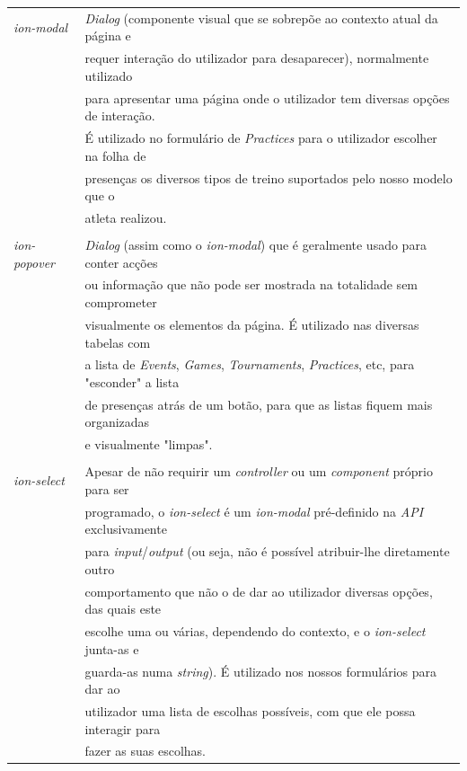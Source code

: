 \begin{tabular}{ll}
	\textit{ion-modal} & \textit{Dialog} (componente visual que se sobrepõe ao contexto atual da página e \\
	&requer interação do utilizador para desaparecer), normalmente utilizado \\
	&para apresentar uma página onde o utilizador tem diversas opções de interação.\\
	& É utilizado no formulário de \textit{Practices} para o utilizador escolher na folha de \\
	&presenças os diversos tipos de treino suportados pelo nosso modelo que o \\
	&atleta realizou.\\
	\\
	\textit{ion-popover} & \textit{Dialog} (assim como o \textit{ion-modal}) que é geralmente usado para conter acções \\
	&ou informação que não pode ser mostrada na totalidade sem comprometer\\
	& visualmente os elementos da página. É utilizado nas diversas tabelas com \\
	&a lista de \textit{Events}, \textit{Games}, \textit{Tournaments}, \textit{Practices}, etc, para "esconder" a lista \\
	&de presenças atrás de um botão, para que as listas fiquem mais organizadas \\
	&e visualmente "limpas".\\
	\\
	\textit{ion-select} & Apesar de não requirir um \textit{controller} ou um \textit{component} próprio para ser \\
	&programado, o \textit{ion-select} é um \textit{ion-modal} pré-definido na \textit{API} exclusivamente \\
	&para \textit{input}/\textit{output} (ou seja, não é possível atribuir-lhe diretamente outro \\
	&comportamento que não o de dar ao utilizador diversas opções, das quais este \\
	&escolhe uma ou várias, dependendo do contexto, e o \textit{ion-select} junta-as e \\
	&guarda-as numa \textit{string}). É utilizado nos nossos formulários para dar ao \\
	&utilizador uma lista de escolhas possíveis, com que ele possa interagir para \\
	&fazer as suas escolhas.
\end{tabular}

